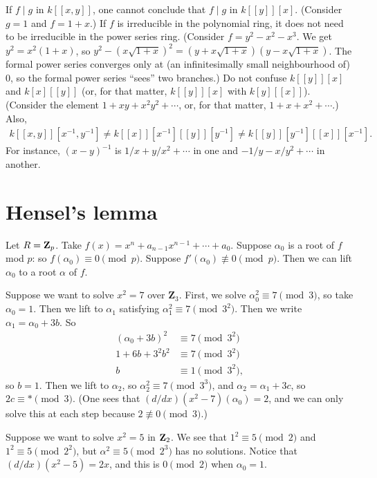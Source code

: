 \documentclass[11pt, oneside,margin=1in]{article}
\begin{document}
\begin{warn}[Traps]
	If $f\mid g$ in $k[\![x,y]\!]$, one cannot conclude that $f\mid g$ in $k[\![y]\!][x]$. (Consider $g=1$ and $f=1+x$.) If $f$ is irreducible in the polynomial ring, it does not need to be irreducible in the power series ring.  (Consider $f = y^2 - x^2 - x^3$. We get $y^2 = x^2(1+x)$, so $y^2 -( x\sqrt{1+x})^2 = (y+x\sqrt{1+x} ) (y-x\sqrt{1+x} )  $. The formal power series converges only at (an infinitesimally small neighbourhood of) $0$, so the formal power series ``sees'' two branches.) Do not confuse $k[\![y]\!][x]$ and $k[x][\![y]\!]$ (or, for that matter, $k[\![y]\!][x]$ with $k[y][\![x]\!]$). (Consider the element $1+xy + x^2y^2+\cdots$, or, for that matter, $1+x+x^2 + \cdots$.) Also,
	\begin{align*}
		k[\![x,y]\!][x^{-1},y^{-1}] \ne k[\![x]\!][x^{-1}][\![y]\!][y^{-1}] \ne k[\![y]\!][y^{-1}][\![x]\!][x^{-1}].
	\end{align*}
For instance, $(x-y) ^{-1}$ is $1/x + y/x^2 + \cdots$ in one and $-1/y - x/y^2 + \cdots$ in another.
\end{warn}
\section{Hensel's lemma}
Let $R=\mathbf Z_p$. Take $f(x)= x^n + a_{n-1}x^{n-1} + \cdots + a_0$. Suppose $\alpha_0$ is a root of $f$ mod $p$: so $f(\alpha_0) \equiv 0\pmod p$. Suppose $f'(\alpha_0) \not\equiv 0\pmod p$. Then we can lift $\alpha_0$ to a root $\alpha$ of $f$.

\begin{example}[ ]\label{hlptwnbd}
Suppose we want to solve $x^2 =7$ over $\mathbf{Z}_3$. First, we solve $\alpha_0 ^2 \equiv 7\pmod 3$, so take $\alpha_0=1$. Then we lift to $\alpha_1$ satisfying $\alpha_1^2 \equiv 7\pmod{3^2}$. Then we write $\alpha_1 = \alpha_0 + 3b$. So 
 \begin{align*}
	 (\alpha_0 + 3b)^2 &\equiv 7\pmod{3^2}\\
	 1 + 6b + 3^2b^2 &\equiv 7 \pmod{3^2}\\
	 b &\equiv 1\pmod {3^2},
\end{align*}
so $b=1$. Then we lift to $\alpha_2$, so $\alpha_2^2 \equiv 7 \pmod{3^3}$, and $\alpha_2 = \alpha_1 + 3c$, so $2c \equiv * \pmod{3}$. (One sees that $(d/dx) (x^2-7) (\alpha_0) = 2$, and we can only solve this at each step because $2\not\equiv 0\pmod 3$.)
\end{example}

\begin{example}[ ]\label{}
Suppose we want to solve $x^2 = 5$ in $\mathbf Z_2$. We see that $1^2 \equiv 5 \pmod 2$ and $1^2 \equiv 5\pmod {2^2}$, but $\alpha^2 \equiv 5\pmod{2^3}$ has no solutions. Notice that $(d/dx) (x^2-5) = 2x$, and this is $0\pmod 2$ when $\alpha_0 = 1$.
\end{example}
\end{document}
